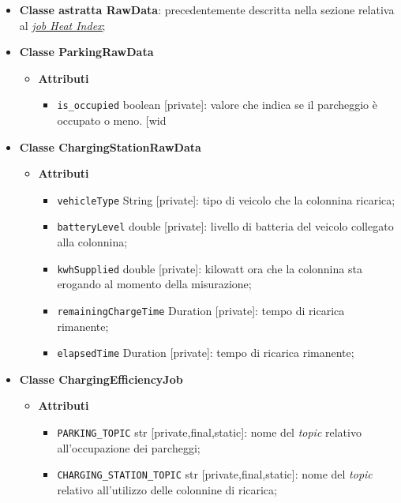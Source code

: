 \begin{itemize}
	\item \textbf{Classe astratta RawData}: precedentemente descritta nella sezione relativa al \hyperref[abstract_class_raw_data]{\textit{\underline{job Heat Index}}};
	\item \textbf{Classe ParkingRawData}
	      \begin{itemize}
		      \item \textbf{Attributi}
		            \begin{itemize}
			            \item \texttt{is\_occupied} boolean [private]: valore che indica se il parcheggio è occupato o meno.
			                  [wid\end{itemize}
	      \end{itemize}
	\item \textbf{Classe ChargingStationRawData}
	      \begin{itemize}
		      \item \textbf{Attributi}
		            \begin{itemize}
			            \item \texttt{vehicleType} String [private]: tipo di veicolo che la colonnina ricarica;
			            \item \texttt{batteryLevel} double [private]: livello di batteria del veicolo collegato alla colonnina;
			            \item \texttt{kwhSupplied} double [private]: kilowatt ora che la colonnina sta erogando al momento della misurazione;
			            \item \texttt{remainingChargeTime} Duration [private]: tempo di ricarica rimanente;
			            \item \texttt{elapsedTime} Duration [private]: tempo di ricarica rimanente;
		            \end{itemize}
	      \end{itemize}
	\item \textbf{Classe ChargingEfficiencyJob}
	      \begin{itemize}
		      \item \textbf{Attributi}
		            \begin{itemize}
			            \item \texttt{PARKING\_TOPIC} str [private,final,static]: nome del \textit{topic} relativo all'occupazione dei parcheggi;
			            \item \texttt{CHARGING\_STATION\_TOPIC} str [private,final,static]: nome del \textit{topic} relativo all'utilizzo delle colonnine di ricarica;

\end{itemize}
\end{itemize}
\end{itemize}
